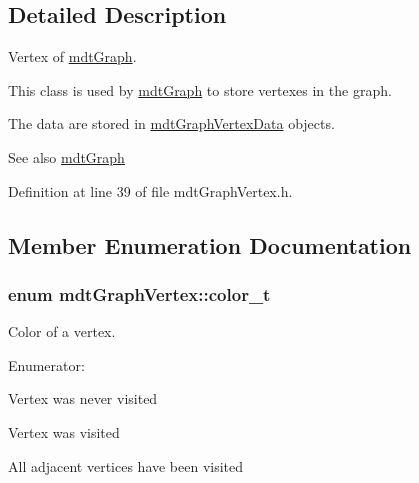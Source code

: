 \subsection{Detailed Description}
Vertex of \hyperlink{classmdt_graph}{mdtGraph}. 

This class is used by \hyperlink{classmdt_graph}{mdtGraph} to store vertexes in the graph.

The data are stored in \hyperlink{classmdt_graph_vertex_data}{mdtGraphVertexData} objects.

\begin{DoxySeeAlso}{See also}
\hyperlink{classmdt_graph}{mdtGraph} 
\end{DoxySeeAlso}


Definition at line 39 of file mdtGraphVertex.h.



\subsection{Member Enumeration Documentation}
\hypertarget{classmdt_graph_vertex_ae658709c9b5a918bf614bfbf79ac49a5}{
\subsubsection[{color\_\-t}]{\setlength{\rightskip}{0pt plus 5cm}enum {\bf mdtGraphVertex::color\_\-t}}}
\label{classmdt_graph_vertex_ae658709c9b5a918bf614bfbf79ac49a5}


Color of a vertex. 

\begin{Desc}
\item[Enumerator: ]\par
\begin{description}
\item[{\em 
\hypertarget{classmdt_graph_vertex_ae658709c9b5a918bf614bfbf79ac49a5adb79d280cadf0fbcf7f8b3c032294e26}{
White}
\label{classmdt_graph_vertex_ae658709c9b5a918bf614bfbf79ac49a5adb79d280cadf0fbcf7f8b3c032294e26}
}]Vertex was never visited \item[{\em 
\hypertarget{classmdt_graph_vertex_ae658709c9b5a918bf614bfbf79ac49a5a8e0204f5dac7a1b7b6b299673ed39ef6}{
Gray}
\label{classmdt_graph_vertex_ae658709c9b5a918bf614bfbf79ac49a5a8e0204f5dac7a1b7b6b299673ed39ef6}
}]Vertex was visited \item[{\em 
\hypertarget{classmdt_graph_vertex_ae658709c9b5a918bf614bfbf79ac49a5ade319c74cc7baa5229e487a93cacca30}{
Black}
\label{classmdt_graph_vertex_ae658709c9b5a918bf614bfbf79ac49a5ade319c74cc7baa5229e487a93cacca30}
}]All adjacent vertices have been visited \end{description}
\end{Desc}



